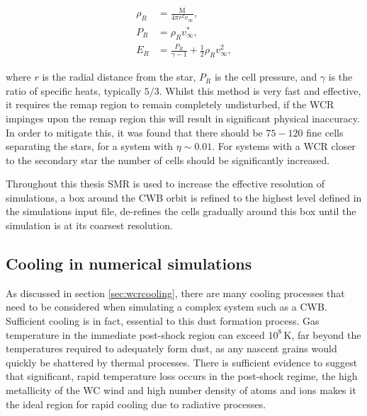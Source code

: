\begin{subequations}
  \begin{align}
    \rho_R &= \frac{\dot{\text{M}}}{4 \pi r^2 v_\infty}, \\
    P_R    &= \rho_R v_\infty^*, \\
    E_R    &= \frac{P_R}{\gamma - 1} + \frac{1}{2} \rho_R v_\infty^2,
  \end{align}
\end{subequations}

\noindent
where $r$ is the radial distance from the star, $P_R$ is the cell pressure, and $\gamma$ is the ratio of specific heats, typically $5/3$.
Whilst this method is very fast and effective, it requires the remap region to remain completely undisturbed, if the WCR impinges upon the remap region this will result in significant physical inaccuracy.
In order to mitigate this, it was found that there should be $75-120$ fine cells separating the stars, for a system with $\eta\sim 0.01$.
For systems with a WCR closer to the secondary star the number of cells should be significantly increased.
 
Throughout this thesis SMR is used to increase the effective resolution of simulations, a box around the CWB orbit is refined to the highest level defined in the simulations input file, \athena{} de-refines the cells gradually around this box until the simulation is at its coarsest resolution.

\subsection{Cooling in numerical simulations}

As discussed in section \ref{sec:wcrcooling}, there are many cooling processes that need to be considered when simulating a complex system such as a CWB.
Sufficient cooling is in fact, essential to this dust formation process.
Gas temperature in the immediate post-shock region can exceed $10^8\, \si{\kelvin}$, far beyond the temperatures required to adequately form dust, as any nascent grains would quickly be shattered by thermal processes.
There is sufficient evidence to suggest that significant, rapid temperature loss occurs in the post-shock regime, the high metallicity of the WC wind and high number density of atoms and ions makes it the ideal region for rapid cooling due to radiative processes.

